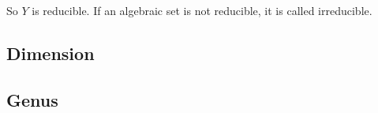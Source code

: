 So $Y$ is reducible. If an algebraic set is not reducible, it is called irreducible.











\subsection{Dimension}
\subsection{Genus}


